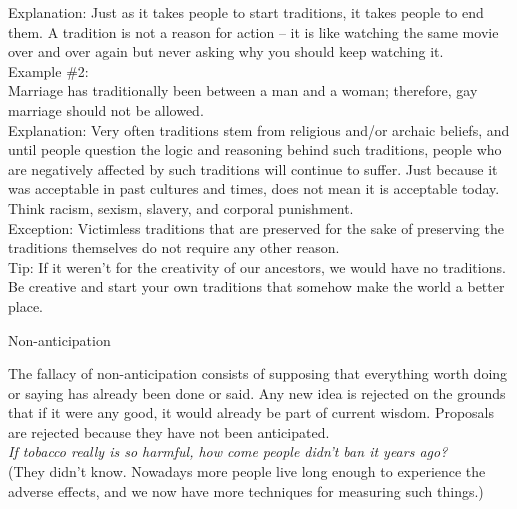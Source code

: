 \documentclass[a4paper,12pt,single,pdftex]{scrartcl}
\begin{document}
{    
      Explanation:  Just as it takes people to start traditions, it takes people to end them.  A tradition is not a reason for action -- it is like watching the same movie over and over again but never asking why you should keep watching it.
    \\

    
      Example \#2:
    \\

    
      Marriage has traditionally been between a man and a woman; therefore, gay marriage should not be allowed.
    \\

    
      Explanation:  Very often traditions stem from religious and/or archaic beliefs, and until people question the logic and reasoning behind such traditions, people who are negatively affected by such traditions will continue to suffer.  Just because it was acceptable in past cultures and times, does not mean it is acceptable today.  Think racism, sexism, slavery, and corporal punishment.
    \\

    
      Exception: Victimless traditions that are preserved for the sake of preserving the traditions themselves do not require any other reason.
    \\

    
      Tip: If it weren’t for the creativity of our ancestors, we would have no traditions.  Be creative and start your own traditions that somehow make the world a better place.
    \\

  }


Non-anticipation
    
      The fallacy of non-anticipation consists of supposing that everything worth doing or saying has already been done or said. Any new idea is rejected on the grounds that if it were any good, it would already be part of current wisdom. Proposals are rejected because they have not been anticipated.
    \\

    
      {\em If tobacco really is so harmful, how come people didn’t ban it years ago?}
    \\

    
      (They didn’t know. Nowadays more people live long enough to experience the adverse effects, and we now have more techniques for measuring such things.)
    \\

    
       
\end{document}
